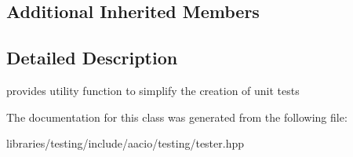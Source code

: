 \subsection*{Additional Inherited Members}


\subsection{Detailed Description}
provides utility function to simplify the creation of unit tests 

The documentation for this class was generated from the following file\+:\begin{DoxyCompactItemize}
\item 
libraries/testing/include/aacio/testing/tester.\+hpp\end{DoxyCompactItemize}
